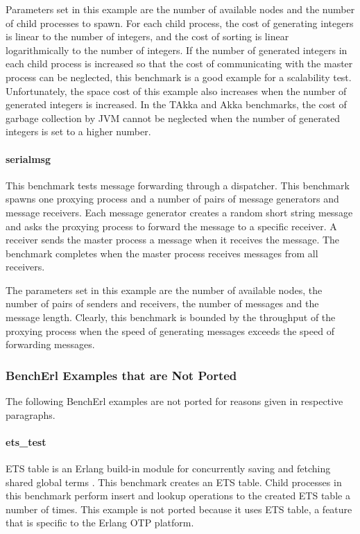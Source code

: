 Parameters set in this example are the number of available nodes and the 
number of child processes to spawn. For each child process, the cost of 
generating integers is linear to the number of integers, and the cost of 
sorting is linear logarithmically to the number of integers.  If the number of 
generated integers in each child process is increased so that the cost of 
communicating with the master process can be neglected, this benchmark is a 
good example for a scalability test.  Unfortunately, the space cost of this 
example also increases when the number of generated integers is increased.  In 
the TAkka and Akka benchmarks, the cost of garbage collection by JVM cannot be 
neglected when the number of generated integers is set to a higher number.


\paragraph{serialmsg} This benchmark tests message forwarding through a
dispatcher.  This benchmark spawns one proxying process and a number of 
pairs of message generators and message receivers.  Each message 
generator creates a random short string message and asks the proxying process 
to forward the message to a specific receiver.  A receiver sends the master 
process a message when it receives the message.  The benchmark completes when 
the master process receives messages from all receivers.

The parameters set in this example are the number of available nodes, the 
number of pairs of senders and receivers,  the number of messages and the 
message length.  Clearly, this benchmark is bounded by the throughput
of the proxying process when the speed of 
generating messages exceeds the speed of forwarding messages.


\subsubsection{BenchErl Examples that are Not Ported}

The following BenchErl examples are not ported for reasons given in respective 
paragraphs.

\paragraph{ets\_test} ETS table is an Erlang build-in module for concurrently 
saving and fetching shared global terms  \citep{ErlangManual}.  This benchmark 
creates an ETS table.  Child processes in this benchmark perform insert and 
lookup operations to the created ETS table a number of times.  This example 
is not ported because it uses ETS table, a feature that is specific to the 
Erlang OTP platform.


